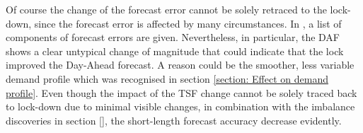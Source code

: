 \documentclass[energies,article,submit,moreauthors,pdftex]{Definitions/mdpi}
\begin{document}
Of course the change of the forecast error cannot be solely retraced to the lock-down, since the forecast error is affected by many circumstances. In \cite{NationalgridESO2018QuarterlyMarch18}, a list of components of forecast errors are given. Nevertheless, in particular, the DAF shows a clear untypical change of magnitude that could indicate that the lock improved the Day-Ahead forecast. A reason could be the smoother, less variable demand profile which was recognised in section \ref{section: Effect on demand profile}. Even though the impact of the TSF change cannot be solely traced back to lock-down due to minimal visible changes, in combination with the imbalance discoveries in section \ref{}, the short-length forecast accuracy decrease evidently.



\end{document}
